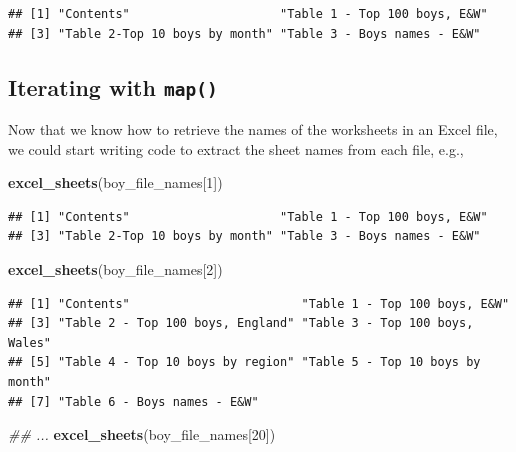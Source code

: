\documentclass[]{book}
\newenvironment{Shaded}{\begin{snugshade}}{\end{snugshade}}
\newcommand{\CommentTok}[1]{\textcolor[rgb]{0.56,0.35,0.01}{\textit{#1}}}
\newcommand{\DecValTok}[1]{\textcolor[rgb]{0.00,0.00,0.81}{#1}}
\newcommand{\KeywordTok}[1]{\textcolor[rgb]{0.13,0.29,0.53}{\textbf{#1}}}
\newcommand{\NormalTok}[1]{#1}
\begin{document}
\begin{verbatim}
## [1] "Contents"                     "Table 1 - Top 100 boys, E&W" 
## [3] "Table 2-Top 10 boys by month" "Table 3 - Boys names - E&W"
\end{verbatim}

\hypertarget{iterating-with-map}{%
\subsection{\texorpdfstring{Iterating with \texttt{map()}}{Iterating with map()}}\label{iterating-with-map}}

Now that we know how to retrieve the names of the worksheets in an
Excel file, we could start writing code to extract the sheet names from
each file, e.g.,

\begin{Shaded}
\begin{Highlighting}[]
\KeywordTok{excel_sheets}\NormalTok{(boy_file_names[}\DecValTok{1}\NormalTok{])}
\end{Highlighting}
\end{Shaded}

\begin{verbatim}
## [1] "Contents"                     "Table 1 - Top 100 boys, E&W" 
## [3] "Table 2-Top 10 boys by month" "Table 3 - Boys names - E&W"
\end{verbatim}

\begin{Shaded}
\begin{Highlighting}[]
\KeywordTok{excel_sheets}\NormalTok{(boy_file_names[}\DecValTok{2}\NormalTok{])}
\end{Highlighting}
\end{Shaded}

\begin{verbatim}
## [1] "Contents"                        "Table 1 - Top 100 boys, E&W"    
## [3] "Table 2 - Top 100 boys, England" "Table 3 - Top 100 boys, Wales"  
## [5] "Table 4 - Top 10 boys by region" "Table 5 - Top 10 boys by month" 
## [7] "Table 6 - Boys names - E&W"
\end{verbatim}

\begin{Shaded}
\begin{Highlighting}[]
\CommentTok{## ...}
\KeywordTok{excel_sheets}\NormalTok{(boy_file_names[}\DecValTok{20}\NormalTok{])}
\end{Highlighting}
\end{Shaded}
\end{document}
